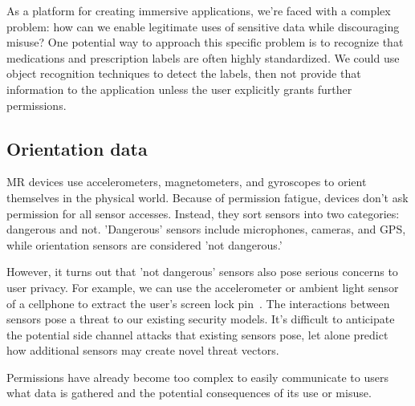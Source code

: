 As a platform for creating immersive applications, we're faced with a complex problem: how can we enable legitimate uses of sensitive data while discouraging misuse? One potential way to approach this specific problem is to recognize that medications and prescription labels are often highly standardized. We could use object recognition techniques to detect the labels, then not provide that information to the application unless the user explicitly grants further permissions.

\subsection{Orientation data}

MR devices use accelerometers, magnetometers, and gyroscopes to orient themselves in the physical world. Because of permission fatigue, devices don't ask permission for all sensor accesses. Instead, they sort sensors into two categories: dangerous and not. 'Dangerous' sensors include microphones, cameras, and GPS, while orientation sensors are considered 'not dangerous.'

However, it turns out that 'not dangerous' sensors also pose serious concerns to user privacy. For example, we can use the accelerometer or ambient light sensor of a cellphone to extract the user's screen lock pin~\cite{aviv2012practicality, spreitzer2018systematic}. The interactions between sensors pose a threat to our existing security models. It's difficult to anticipate the potential side channel attacks that existing sensors pose, let alone predict how additional sensors may create novel threat vectors.

Permissions have already become too complex to easily communicate to users what data is gathered and the potential consequences of its use or misuse.
